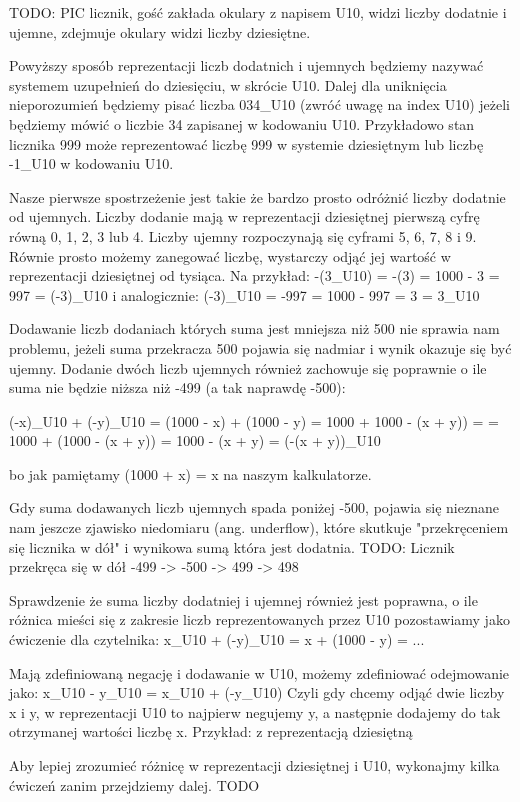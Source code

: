 TODO: PIC licznik, gość zakłada okulary z napisem U10,
widzi liczby dodatnie i ujemne, zdejmuje okulary widzi liczby
dziesiętne.

Powyższy sposób reprezentacji liczb dodatnich i ujemnych będziemy
nazywać systemem uzupełnień do dziesięciu, w skrócie U10.
Dalej dla uniknięcia nieporozumień będziemy pisać
liczba 034_U10 (zwróć uwagę na index U10) jeżeli będziemy mówić o liczbie 34
zapisanej w kodowaniu U10. Przykładowo stan licznika 999 może reprezentować
liczbę 999 w systemie dziesiętnym lub liczbę -1_U10 w kodowaniu U10. 

Nasze pierwsze spostrzeżenie jest takie że bardzo prosto odróżnić
liczby dodatnie od ujemnych. Liczby dodanie mają w reprezentacji dziesiętnej
pierwszą cyfrę równą 0, 1, 2, 3 lub 4. 
Liczby ujemny rozpoczynają się cyframi 5, 6, 7, 8 i 9.
Równie prosto możemy zanegować liczbę, wystarczy odjąć jej wartość 
w reprezentacji dziesiętnej od tysiąca. Na przykład:
-(3_U10) = -(3) = 1000 - 3 = 997 = (-3)_U10
i analogicznie:
(-3)_U10 = -997 = 1000 - 997 = 3 = 3_U10

Dodawanie liczb dodaniach których suma jest mniejsza niż 500 nie
sprawia nam problemu, jeżeli suma przekracza 500 pojawia się nadmiar i wynik
okazuje się być ujemny. 
Dodanie dwóch liczb ujemnych również zachowuje się poprawnie
o ile suma nie będzie niższa niż -499 (a tak naprawdę -500):

(-x)_U10 + (-y)_U10 = (1000 - x) + (1000 - y) = 1000 + 1000 - (x + y)) =
= 1000 + (1000 - (x + y)) = 1000 - (x + y) = (-(x + y))_U10

bo jak pamiętamy (1000 + x) = x na naszym kalkulatorze.

Gdy suma dodawanych liczb ujemnych spada poniżej -500, pojawia się
nieznane nam jeszcze zjawisko niedomiaru (ang. underflow),
które skutkuje "przekręceniem się licznika w dół" i wynikowa sumą która
jest dodatnia.
TODO: Licznik przekręca się w dół -499 -> -500 -> 499 -> 498

Sprawdzenie że suma liczby dodatniej i ujemnej również jest poprawna,
o ile różnica mieści się z zakresie liczb reprezentowanych przez U10
pozostawiamy jako ćwiczenie dla czytelnika:
x_U10 + (-y)_U10 = x + (1000 - y) = ...

Mają zdefiniowaną negację i dodawanie w U10, możemy zdefiniować
odejmowanie jako:
x_U10 - y_U10 = x_U10 + (-y_U10)
Czyli gdy chcemy odjąć dwie liczby x i y, w reprezentacji U10
to najpierw negujemy y, a następnie dodajemy do tak otrzymanej wartości
liczbę x.
Przykład: z reprezentacją dziesiętną

Aby lepiej zrozumieć różnicę w reprezentacji dziesiętnej i U10,
wykonajmy kilka ćwiczeń zanim przejdziemy dalej.
TODO


